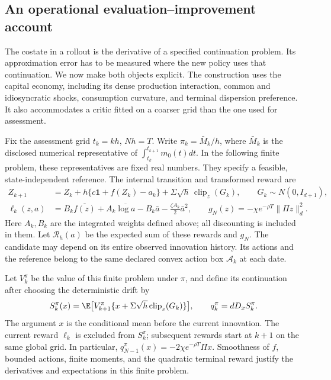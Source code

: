 \subsection{An operational evaluation--improvement account}
\label{sec:r15mechanism}
The costate in a rollout is the derivative of a specified continuation
problem. Its approximation error has to be measured where the new policy
uses that continuation. We now make both objects explicit. The construction
uses the capital economy, including its dense production interaction,
common and idiosyncratic shocks, consumption curvature, and terminal
dispersion preference. It also accommodates a critic fitted on a coarser
grid than the one used for assessment.

Fix the assessment grid $t_k=kh$, $Nh=T$. Write $\pi_k=\bar M_k/h$,
where $\bar M_k$ is the disclosed numerical representative of
$\int_{t_k}^{t_{k+1}}m_0(t)dt$. In the following finite problem, these
representatives are fixed real numbers. They specify a feasible,
state-independent reference. The internal transition and transformed
reward are
\begin{align}
 Z_{k+1}&=Z_k+h\{c\bm1+f(Z_k)-a_k\}
                  +\Sigma\sqrt h\,\operatorname{clip}_{z}(G_k),
       \qquad G_k\sim N(0,I_{d+1}),\label{eq:r15finite}\\
 \ell_k(z,a)&=B_k\overline{f(z)}+A_k\overline{\log a}
       -B_k\bar a-\frac{\zeta A_k}{2}\bar a^2,
       \qquad g_N(z)=-\chi e^{-\rho T}\|\Pi z\|_d^2.
       \label{eq:r15reward}
\end{align}
Here $A_k,B_k$ are the integrated weights defined above; all discounting
is included in them. Let $\mathcal R_h(a)$ be the expected sum of these
rewards and $g_N$. The candidate may depend on its entire observed
innovation history. Its actions and the reference belong to the same
declared convex action box $\mathcal A_k$ at each date.

Let $V_k^\pi$ be the value of this finite problem under $\pi$, and define
its continuation after choosing the deterministic drift by
\begin{equation}
 S_k^\pi(x)=\E\big[V_{k+1}^\pi
       \{x+\Sigma\sqrt h\operatorname{clip}_{z}(G_k)\}\big],
 \qquad q_k^\pi=dD_xS_k^\pi.
 \label{eq:r15postdecision}
\end{equation}
The argument $x$ is the conditional mean before the current innovation.
The current reward $\ell_k$ is excluded from $S_k^\pi$; subsequent
rewards start at $k+1$ on the same global grid. In particular,
$q_{N-1}^\pi(x)=-2\chi e^{-\rho T}\Pi x$. Smoothness of $f$, bounded
actions, finite moments, and the quadratic terminal reward justify the
derivatives and expectations in this finite problem.


